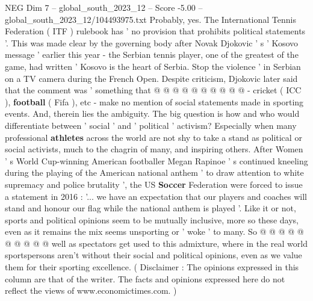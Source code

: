 \begin{textsample}{NEG Dim 7 – global\_south\_2023\_12 – Score -5.00 – global\_south\_2023\_12/104493975.txt}
Probably, yes.
The International Tennis Federation ( ITF ) rulebook has ' no provision that prohibits political statements '.
This was made clear by the governing body after Novak Djokovic ' s ' Kosovo message ' earlier this year - the Serbian tennis player, one of the greatest of the game, had written ' Kosovo is the heart of Serbia.
Stop the violence ' in Serbian on a TV camera during the French Open.
Despite criticism, Djokovic later said that the comment was ' something that @ @ @ @ @ @ @ @ @ @ - cricket ( ICC ), \textbf{football} ( Fifa ), etc - make no mention of social statements made in sporting events.
And, therein lies the ambiguity.
The big question is how and who would differentiate between ' social ' and ' political ' activism?
Especially when many professional \textbf{athletes} across the world are not shy to take a stand as political or social activists, much to the chagrin of many, and inspiring others.
After Women ' s World Cup-winning American footballer Megan Rapinoe ' s continued kneeling during the playing of the American national anthem ' to draw attention to white supremacy and police brutality ', the US \textbf{Soccer} Federation were forced to issue a statement in 2016 : '... we have an expectation that our players and coaches will stand and honour our flag while the national anthem is played '.
Like it or not, sports and political opinions seem to be mutually inclusive, more so these days, even as it remains the mix seems unsporting or ' woke ' to many.
So @ @ @ @ @ @ @ @ @ @ well as spectators get used to this admixture, where in the real world sportspersons aren't without their social and political opinions, even as we value them for their sporting excellence. ( Disclaimer : The opinions expressed in this column are that of the writer.
The facts and opinions expressed here do not reflect the views of www.economictimes.com. )

\end{textsample}
